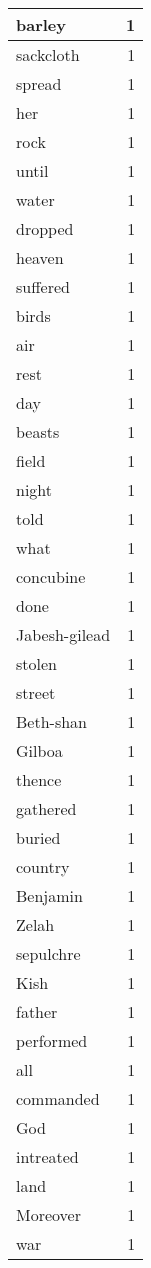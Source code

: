 \begin{center}
\begin{longtable}{l|r}
barley & 1 \\ \hline
sackcloth & 1 \\ \hline
spread & 1 \\ \hline
her & 1 \\ \hline
rock & 1 \\ \hline
until & 1 \\ \hline
water & 1 \\ \hline
dropped & 1 \\ \hline
heaven & 1 \\ \hline
suffered & 1 \\ \hline
birds & 1 \\ \hline
air & 1 \\ \hline
rest & 1 \\ \hline
day & 1 \\ \hline
beasts & 1 \\ \hline
field & 1 \\ \hline
night & 1 \\ \hline
told & 1 \\ \hline
what & 1 \\ \hline
concubine & 1 \\ \hline
done & 1 \\ \hline
Jabesh-gilead & 1 \\ \hline
stolen & 1 \\ \hline
street & 1 \\ \hline
Beth-shan & 1 \\ \hline
Gilboa & 1 \\ \hline
thence & 1 \\ \hline
gathered & 1 \\ \hline
buried & 1 \\ \hline
country & 1 \\ \hline
Benjamin & 1 \\ \hline
Zelah & 1 \\ \hline
sepulchre & 1 \\ \hline
Kish & 1 \\ \hline
father & 1 \\ \hline
performed & 1 \\ \hline
all & 1 \\ \hline
commanded & 1 \\ \hline
God & 1 \\ \hline
intreated & 1 \\ \hline
land & 1 \\ \hline
Moreover & 1 \\ \hline
war & 1 \\ \hline

\end{longtable}
\end{center}
